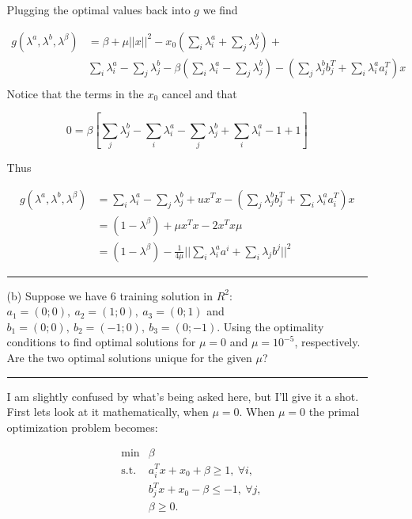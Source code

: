 \documentclass{article} %
\begin{document}
\begin{enumerate}
\begin{itemize}
Plugging the optimal values back into $g$ we find

\begin{equation*}
\begin{aligned}
g(\lambda^a, \lambda^b, \lambda^{\beta}) &= \beta + \mu||x||^2 - x_0(\sum_i \lambda_i^a + \sum_j \lambda_j^b) + \\ 
& \sum_i \lambda_i^a - \sum_j \lambda_j^b
- \beta( \sum_i \lambda_i^a - \sum_j \lambda_j^b ) - (\sum_j \lambda_j^b b_j^T + \sum_i \lambda_i^a a_i^T) x \\ 
\end{aligned}
\end{equation*}
Notice that the terms in the $x_0$ cancel and that 

\[
0 = \beta[ \sum_j \lambda_j^b - \sum_i \lambda_i^a - \sum_j \lambda_j^b + \sum_i \lambda_i^a - 1 + 1]
\]

Thus 

\begin{equation*}
\begin{aligned}
g(\lambda^a, \lambda^b, \lambda^{\beta}) &= \sum_i \lambda_i^a - \sum_j \lambda_j^b + u x^T x -  (\sum_j \lambda_j^b b_j^T + \sum_i \lambda_i^a a_i^T) x \\ 
&= (1 - \lambda^{\beta}) + \mu x^T x - 2 x^Tx \mu \\ 
&= (1 - \lambda^{\beta}) - \frac{1}{4 \mu} || \sum_{i}\lambda_i^a a^i + \sum_{i} \lambda_j b^j ||^2
\end{aligned}
\end{equation*}



\rule{\textwidth}{1pt}


\item[(b)] Suppose we have $6$ training solution in $R^2$: $a_1=(0;0),\ a_2=(1;0),\ a_3=(0;1)$ and $b_1=(0;0),\ b_2=(-1;0),\ b_3=(0;-1)$. Using the optimality conditions to find optimal solutions for $\mu=0$ and $\mu=10^{-5}$, respectively. Are the two optimal solutions unique for the given $\mu$?

\rule{\textwidth}{1pt}

I am slightly confused by what's being asked here, but I'll give it a shot. First lets look at it mathematically, when $\mu = 0$. When $ \mu = 0$ the primal optimization problem becomes:

\[ 
\begin{array}{rrl} 
&\min &  \beta\\ 
&\mbox{s.t.}& a_i^Tx+x_0+\beta\ge 1,\ \forall i,\\ 
& & b_j^Tx+x_0-\beta\le -1,\ \forall j,\\
& & \beta \ge 0.
\end{array} 
\]




\end{itemize}
\end{enumerate}
\end{document}
